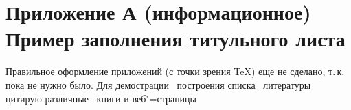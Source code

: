 \section*{Приложение А (информационное)  Пример заполнения титульного листа} 
Правильное оформление приложений (с точки зрения \TeX{}) еще не сделано, т.\,к. пока не нужно было. 
Для демострации~\cite{Morozov_2011} построения списка~\cite[книженция]{kulezin_2004} литературы~\cite{guk_1999} цитирую различные~\cite{kluev_1989} книги и веб"=страницы~\cite{cite_webpage}

